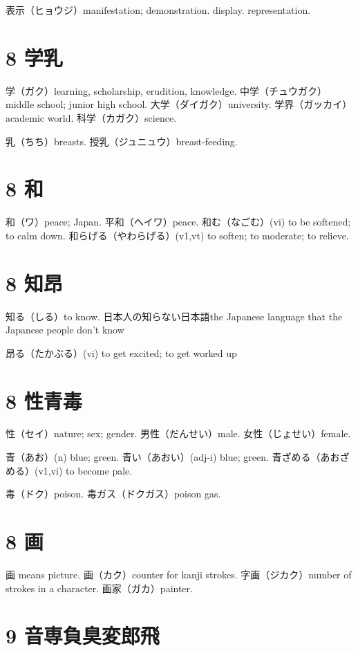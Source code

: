 表示（ヒョウジ）manifestation; demonstration. display. representation.

\section{8 学乳}

学（ガク）learning, scholarship, erudition, knowledge.
中学（チュウガク）middle school; junior high school.
大学（ダイガク）university.
学界（ガッカイ）academic world.
科学（カガク）science.

乳（ちち）breasts.
授乳（ジュニュウ）breast-feeding.

\section{8 和}

和（ワ）peace; Japan.
平和（ヘイワ）peace.
和む（なごむ）(vi) to be softened; to calm down.
和らげる（やわらげる）(v1,vt) to soften; to moderate; to relieve.

\section{8 知昂}

知る（しる）to know.
日本人の知らない日本語the Japanese language that the Japanese people don't know

昂る（たかぶる）(vi) to get excited; to get worked up

\section{8 性青毒}

性（セイ）nature; sex; gender.
男性（だんせい）male.
女性（じょせい）female.

青（あお）(n) blue; green.
青い（あおい）(adj-i) blue; green.
青ざめる（あおざめる）(v1,vi) to become pale.

毒（ドク）poison.
毒ガス（ドクガス）poison gas.

\section{8 画}

画 means picture.
画（カク）counter for kanji strokes.
字画（ジカク）number of strokes in a character.
画家（ガカ）painter.

\section{9 音専負臭変郎飛}

